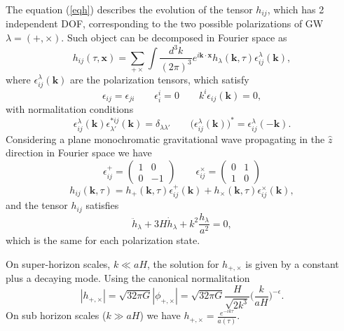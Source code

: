 \documentclass[11pt,a4paper,twoside]{book}
\begin{document}
The equation (\ref{eqh}) describes the evolution of the tensor $ h_{ij} $, which has 2 independent DOF, corresponding to the two possible polarizations of GW $ \lambda = (+,\times) $. Such object can be decomposed in Fourier space as 
\begin{equation}
	\label{fouriewrh}
	h_{ij}(\tau,\textbf{x}) = \sum_{+\times} \int \frac{d^{3} k}{(2\pi)^{3}}e^{i\textbf{k}\cdot \textbf{x}}h_{\lambda}(\textbf{k},\tau)\epsilon^{\lambda}_{ij}(\textbf{k}),
\end{equation}
where $ \epsilon^{\lambda}_{ij}(\textbf{k}) $ are the polarization tensors, which satisfy
\begin{equation}
	\epsilon_{ij}=\epsilon_{ji} \qquad \epsilon^{i}_{i}=0 \qquad  k^{i}\epsilon_{ij}(\textbf{k}) =0,
\end{equation}
 with normalitation conditions
 \begin{equation}
 \epsilon_{ij}^{\lambda}(\textbf{k})\epsilon^{*ij}_{\lambda'}(\textbf{k})=\delta_{\lambda\lambda'}
 \qquad
 \big (\epsilon_{ij}^{\lambda}(\textbf{k})\big)^{*} = \epsilon_{ij}^{\lambda}(-\textbf{k}).
 \end{equation}
Considering a plane monochromatic gravitational wave propagating in the $\hat{z}$ direction in Fourier space we have
\begin{equation}
	\epsilon^{+}_{ij} = 
	\begin{pmatrix}
		1 & 0 \\
		0 & -1
	\end{pmatrix}
\qquad
\epsilon^{\times}_{ij} = 
\begin{pmatrix}
	0 & 1 \\
	1 & 0
\end{pmatrix}
\end{equation}
\begin{equation}
	h_{ij}(\textbf{k},\tau) = h_{+}(\textbf{k},\tau)\epsilon_{ij}^{+}(\textbf{k}) + 
	h_{\times}(\textbf{k},\tau)\epsilon_{ij}^{\times}(\textbf{k}),
\end{equation}
and the tensor $ h_{ij} $ satisfies
\begin{equation}
	\ddot{h}_{\lambda} + 3H\dot{h}_{\lambda}+ k^{2}\frac{h_{\lambda}}{a^{2}}=0,
\end{equation}
which is the same for each polarization state.

On super-horizon scales, $ k\ll aH $, the solution for $ h_{+,\times} $ is given by a constant plus a decaying mode. Using the canonical normalitation
\begin{equation}
|h_{+,\times}|= \sqrt{32\pi G}|\phi_{+,\times}| = \sqrt{32\pi G} \frac{H}{\sqrt{2k^{3}}}\Big (\frac{k}{aH}\Big)^{-\epsilon}.
\end{equation}
On sub horizon scales ($ k \gg aH $) we have $ h_{+,\times}=\frac{e^{-ik\tau}}{a(\tau)} $.
\end{document}
